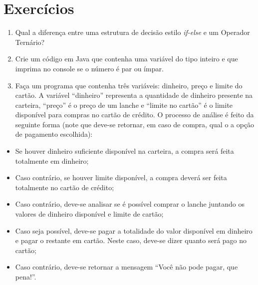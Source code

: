 \documentclass[
]{book}
\providecommand{\tightlist}{%
  \setlength{\itemsep}{0pt}\setlength{\parskip}{0pt}}
\begin{document}
\hypertarget{exercuxedcios}{%
\section*{Exercícios}\label{exercuxedcios}}

\begin{enumerate}
\def\labelenumi{\arabic{enumi}.}
\tightlist
\item
  Qual a diferença entre uma estrutura de decisão estilo \emph{if-else} e um Operador Ternário?
\item
  Crie um código em Java que contenha uma variável do tipo inteiro e que imprima no console se o número é par ou ímpar.
\item
  Faça um programa que contenha três variáveis: dinheiro, preço e limite do cartão. A variável ``dinheiro'' representa a quantidade de dinheiro presente na carteira, ``preço'' é o preço de um lanche e ``limite no cartão'' é o limite disponível para compras no cartão de crédito. O processo de análise é feito da seguinte forma (note que deve-se retornar, em caso de compra, qual o a opção de pagamento escolhida):
\end{enumerate}

\begin{itemize}
\tightlist
\item
  Se houver dinheiro suficiente disponível na carteira, a compra será feita totalmente em dinheiro;
\item
  Caso contrário, se houver limite disponível, a compra deverá ser feita totalmente no cartão de crédito;
\item
  Caso contrário, deve-se analisar se é possível comprar o lanche juntando os valores de dinheiro disponível e limite de cartão;
\item
  Caso seja possível, deve-se pagar a totalidade do valor disponível em dinheiro e pagar o restante em cartão. Neste caso, deve-se dizer quanto será pago no cartão;
\item
  Caso contrário, deve-se retornar a mensagem ``Você não pode pagar, que pena!''.
\end{itemize}
\end{document}
